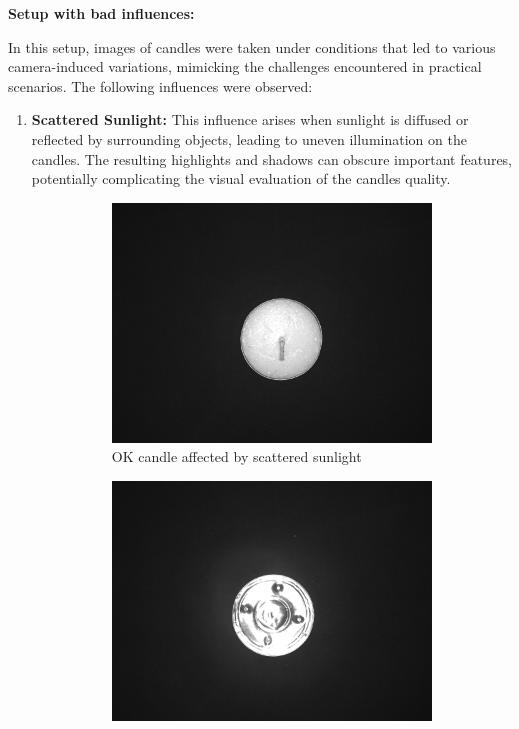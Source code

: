 \documentclass[12pt,DIV14,BCOR12mm,a4paper,footinclude=false,headinclude,parskip=half-,twoside,openright,cleardoublepage=empty,toc=index,bibliography=totoc,listof=totoc]{scrreprt}
\numberwithin{equation}{chapter}
\begin{document}
\textbf{Setup with bad influences:}

In this setup, images of candles were taken under conditions that led to various camera-induced variations, mimicking the challenges encountered in practical scenarios. The following influences were observed:

\begin{enumerate}
    \item \textbf{Scattered Sunlight:} This influence arises when sunlight is diffused or reflected by surrounding objects, leading to uneven illumination on the candles. The resulting highlights and shadows can obscure important features, potentially complicating the visual evaluation of the candles quality.

    \begin{figure}
        \centering
        \begin{subfigure}[b]{0.45\textwidth}
            \centering
            \includegraphics[scale=0.15]{../media/Candles-influence-sunlight-OK.png}
            \caption{OK candle affected by scattered sunlight}
        \end{subfigure}
        \hfill
        \begin{subfigure}[b]{0.45\textwidth}
            \centering
            \includegraphics[scale=0.15]{../media/Candles-influence-sunlight-NOK.png}

\end{subfigure}
\end{figure}
\end{enumerate}
\end{document}
